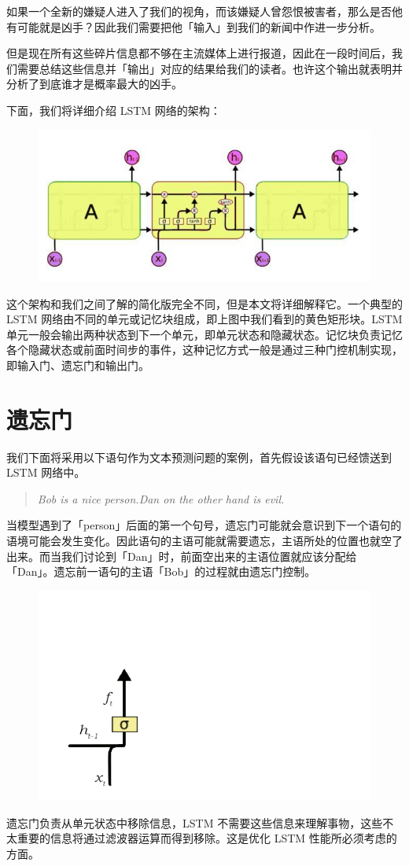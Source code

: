 \documentclass{article}
\begin{document}
如果一个全新的嫌疑人进入了我们的视角，而该嫌疑人曾怨恨被害者，那么是否他有可能就是凶手？因此我们需要把他「输入」到我们的新闻中作进一步分析。

但是现在所有这些碎片信息都不够在主流媒体上进行报道，因此在一段时间后，我们需要总结这些信息并「输出」对应的结果给我们的读者。也许这个输出就表明并分析了到底谁才是概率最大的凶手。

下面，我们将详细介绍 LSTM 网络的架构：
\begin{figure}[H]
	\centering
	\includegraphics[scale=0.3]{2.jpg}
\end{figure}
这个架构和我们之间了解的简化版完全不同，但是本文将详细解释它。一个典型的 LSTM 网络由不同的单元或记忆块组成，即上图中我们看到的黄色矩形块。LSTM 单元一般会输出两种状态到下一个单元，即单元状态和隐藏状态。记忆块负责记忆各个隐藏状态或前面时间步的事件，这种记忆方式一般是通过三种门控机制实现，即输入门、遗忘门和输出门。
\section{遗忘门}
我们下面将采用以下语句作为文本预测问题的案例，首先假设该语句已经馈送到 LSTM 网络中。
\begin{quote}
	\emph{Bob is a nice person.Dan on the other hand is evil.}
\end{quote}
当模型遇到了「person」后面的第一个句号，遗忘门可能就会意识到下一个语句的语境可能会发生变化。因此语句的主语可能就需要遗忘，主语所处的位置也就空了出来。而当我们讨论到「Dan」时，前面空出来的主语位置就应该分配给「Dan」。遗忘前一语句的主语「Bob」的过程就由遗忘门控制。

\begin{figure}[H]
	\centering
	\includegraphics[scale=0.3]{3.png}
\end{figure}
遗忘门负责从单元状态中移除信息，LSTM 不需要这些信息来理解事物，这些不太重要的信息将通过滤波器运算而得到移除。这是优化 LSTM 性能所必须考虑的方面。
\end{document}

